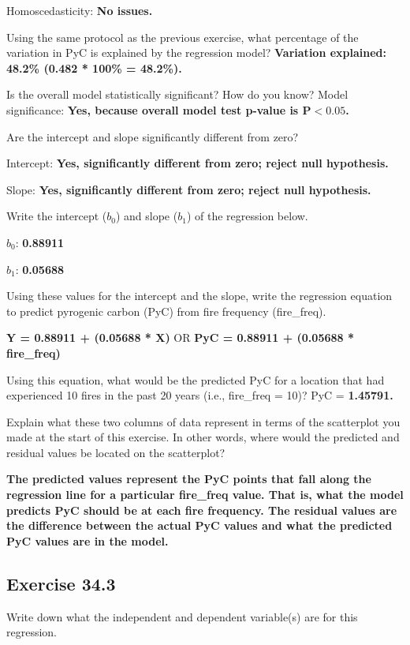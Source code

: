 \documentclass[
  openany]{krantz}
\begin{document}
Homoscedasticity: \textbf{No issues.}

Using the same protocol as the previous exercise, what percentage of the variation in PyC is explained by the regression model? \textbf{Variation explained: 48.2\% (0.482 * 100\% = 48.2\%).}

Is the overall model statistically significant? How do you know? Model significance: \textbf{Yes, because overall model test p-value is \(\mathbf{P < 0.05}\).}

Are the intercept and slope significantly different from zero?

Intercept: \textbf{Yes, significantly different from zero; reject null hypothesis.}

Slope: \textbf{Yes, significantly different from zero; reject null hypothesis.}

Write the intercept (\(b_{0}\)) and slope (\(b_{1}\)) of the regression below.

\(b_{0}\): \textbf{0.88911}

\(b_{1}\): \textbf{0.05688}

Using these values for the intercept and the slope, write the regression equation to predict pyrogenic carbon (PyC) from fire frequency (fire\_freq).

\textbf{Y = 0.88911 + (0.05688 * X)} OR \textbf{PyC = 0.88911 + (0.05688 * fire\_freq)}

Using this equation, what would be the predicted PyC for a location that had experienced 10 fires in the past 20 years (i.e., fire\_freq = 10)? PyC = \textbf{1.45791.}

Explain what these two columns of data represent in terms of the scatterplot you made at the start of this exercise. In other words, where would the predicted and residual values be located on the scatterplot?

\textbf{The predicted values represent the PyC points that fall along the regression line for a particular fire\_freq value. That is, what the model predicts PyC should be at each fire frequency. The residual values are the difference between the actual PyC values and what the predicted PyC values are in the model.}

\hypertarget{exercise-34.3}{%
\subsection{Exercise 34.3}\label{exercise-34.3}}

Write down what the independent and dependent variable(s) are for this regression.
\end{document}
